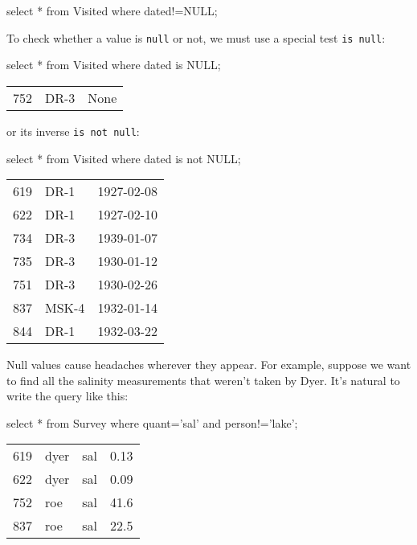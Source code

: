 \documentclass{book}
\begin{document}

\begin{VerbIn}
select * from Visited where dated!=NULL;
\end{VerbIn}


To check whether a value is \texttt{null} or not, we must use a special
test \texttt{is null}:

\begin{VerbIn}
select * from Visited where dated is NULL;
\end{VerbIn}

\begin{tabular}{lll}
752 & DR-3 & None \\
\end{tabular}

or its inverse \texttt{is not null}:

\begin{VerbIn}
select * from Visited where dated is not NULL;
\end{VerbIn}

\begin{tabular}{lll}
619 & DR-1 & 1927-02-08 \\
622 & DR-1 & 1927-02-10 \\
734 & DR-3 & 1939-01-07 \\
735 & DR-3 & 1930-01-12 \\
751 & DR-3 & 1930-02-26 \\
837 & MSK-4 & 1932-01-14 \\
844 & DR-1 & 1932-03-22 \\
\end{tabular}

Null values cause headaches wherever they appear. For example, suppose
we want to find all the salinity measurements that weren't taken by
Dyer. It's natural to write the query like this:

\begin{VerbIn}
select * from Survey where quant='sal' and person!='lake';
\end{VerbIn}

\begin{tabular}{llll}
619 & dyer & sal & 0.13 \\
622 & dyer & sal & 0.09 \\
752 & roe & sal & 41.6 \\
837 & roe & sal & 22.5 \\
\end{tabular}
\end{document}

